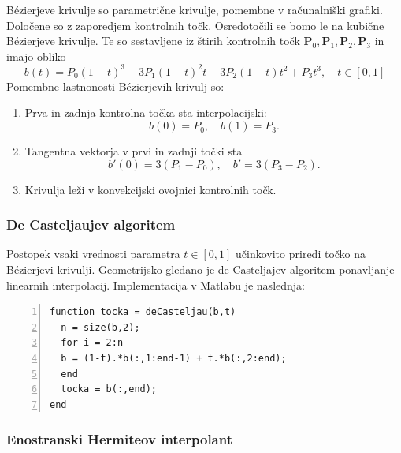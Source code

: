 \documentclass[a4paper,12pt]{article}
\begin{document}
	B\'{e}zierjeve krivulje so parametrične krivulje, pomembne v računalniški grafiki. Določene so z zaporedjem kontrolnih točk.
	Osredotočili se bomo le na kubične B\'{e}zierjeve krivulje. Te so sestavljene iz štirih kontrolnih točk $\boldsymbol{P}_0, \boldsymbol{P}_1, \boldsymbol{P}_2, \boldsymbol{P}_3$ in imajo obliko
	\begin{equation*}
		b(t) = P_0(1-t)^3 + 3P_1(1-t)^2t + 3P_2(1-t)t^2 + P_3t^3, \quad t \in [0,1]
	\end{equation*}
	Pomembne lastnonosti B\'{e}zierjevih krivulj so: 
	\begin{enumerate}[label=(\roman*)]
		\item Prva in zadnja kontrolna točka sta interpolacijski: 
		$$b(0) = P_0,\quad b(1) = P_3.$$
		\item Tangentna vektorja v prvi in zadnji točki sta
		$$b'(0) = 3(P_1 - P_0),\quad b' = 3(P_3 - P_2).$$
		\item Krivulja leži v konvekcijski ovojnici kontrolnih točk.

	\end{enumerate}
	
	\subsubsection{De Casteljaujev algoritem}
	
	Postopek vsaki vrednosti parametra $t \in [0,1]$ učinkovito priredi točko na B\'{e}zierjevi krivulji. Geometrijsko gledano je de Casteljajev algoritem ponavljanje linearnih interpolacij.
	Implementacija v Matlabu je naslednja:
	\begin{lstlisting}[style=Matlab-editor,numbers=left]
function tocka = deCasteljau(b,t)
  n = size(b,2);
  for i = 2:n
  b = (1-t).*b(:,1:end-1) + t.*b(:,2:end);   
  end
  tocka = b(:,end);
end
	\end{lstlisting}
	
	
	\subsubsection{Enostranski Hermiteov interpolant}
	
\end{document}
